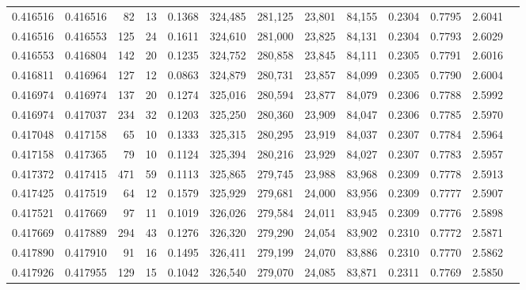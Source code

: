 \begin{tabular}{rrrrrrrrrrrrr}
0.416516 & 0.416516 &    82 &  13 &                                     0.1368 & 324,485 & 281,125 &  23,801 &  84,155 & 0.2304 & 0.7795 & 2.6041 \\
0.416516 & 0.416553 &   125 &  24 &                                     0.1611 & 324,610 & 281,000 &  23,825 &  84,131 & 0.2304 & 0.7793 & 2.6029 \\
0.416553 & 0.416804 &   142 &  20 &                                     0.1235 & 324,752 & 280,858 &  23,845 &  84,111 & 0.2305 & 0.7791 & 2.6016 \\
0.416811 & 0.416964 &   127 &  12 &                                     0.0863 & 324,879 & 280,731 &  23,857 &  84,099 & 0.2305 & 0.7790 & 2.6004 \\
0.416974 & 0.416974 &   137 &  20 &                                     0.1274 & 325,016 & 280,594 &  23,877 &  84,079 & 0.2306 & 0.7788 & 2.5992 \\
0.416974 & 0.417037 &   234 &  32 &                                     0.1203 & 325,250 & 280,360 &  23,909 &  84,047 & 0.2306 & 0.7785 & 2.5970 \\
0.417048 & 0.417158 &    65 &  10 &                                     0.1333 & 325,315 & 280,295 &  23,919 &  84,037 & 0.2307 & 0.7784 & 2.5964 \\
0.417158 & 0.417365 &    79 &  10 &                                     0.1124 & 325,394 & 280,216 &  23,929 &  84,027 & 0.2307 & 0.7783 & 2.5957 \\
0.417372 & 0.417415 &   471 &  59 &                                     0.1113 & 325,865 & 279,745 &  23,988 &  83,968 & 0.2309 & 0.7778 & 2.5913 \\
0.417425 & 0.417519 &    64 &  12 &                                     0.1579 & 325,929 & 279,681 &  24,000 &  83,956 & 0.2309 & 0.7777 & 2.5907 \\
0.417521 & 0.417669 &    97 &  11 &                                     0.1019 & 326,026 & 279,584 &  24,011 &  83,945 & 0.2309 & 0.7776 & 2.5898 \\
0.417669 & 0.417889 &   294 &  43 &                                     0.1276 & 326,320 & 279,290 &  24,054 &  83,902 & 0.2310 & 0.7772 & 2.5871 \\
0.417890 & 0.417910 &    91 &  16 &                                     0.1495 & 326,411 & 279,199 &  24,070 &  83,886 & 0.2310 & 0.7770 & 2.5862 \\
0.417926 & 0.417955 &   129 &  15 &                                     0.1042 & 326,540 & 279,070 &  24,085 &  83,871 & 0.2311 & 0.7769 & 2.5850 \\

\end{tabular}
